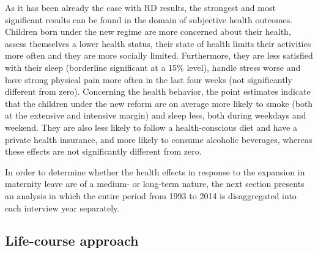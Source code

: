 \documentclass[a4paper ]{article}
\renewcommand{\headrulewidth}{0.5pt}
\begin{document}
As it has been already the case with RD results, the strongest and most significant results can be found in the domain of subjective health outcomes. Children born under the new regime are more concerned about their health, assess themselves a lower health status, their state of health limits their activities more often and they are more socially limited. Furthermore, they are less satisfied with their sleep (borderline significant at a 15\% level), handle stress worse and have strong physical pain more often in the last four weeks (not significantly different from zero).
Concerning the health behavior, the point estimates indicate that the children under the new reform are on average more likely to smoke (both at the extensive and intensive margin) and sleep less, both during weekdays and weekend. They are also less likely to follow a health-conscious diet and have a private health insurance, and more likely to consume alcoholic beverages, whereas these effects are not significantly different from zero.\newline



In order to determine whether the health effects in response to the expansion in maternity leave are of a medium- or long-term nature, the next section presents an analysis in which the entire period from 1993 to 2014 is disaggregated into each interview year separately. 









	
	





\bigskip
\subsection{Life-course approach}\label{sec: lifecourse approach}
\end{document}
